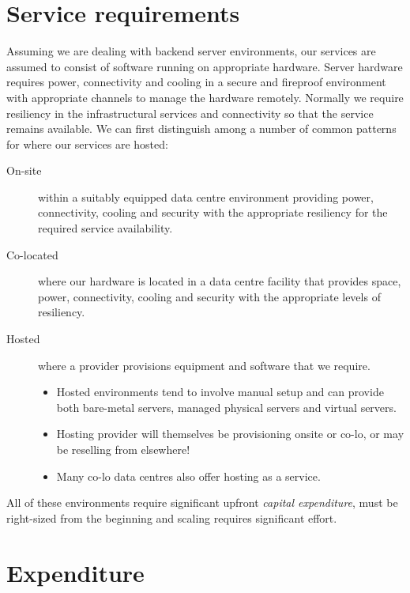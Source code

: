 \section{Service requirements}
\label{sec:service-models}

Assuming we are dealing with backend server environments, our services
are assumed to consist of software running on appropriate hardware.
Server hardware requires power, connectivity and cooling in a secure and
fireproof environment with appropriate channels to manage the hardware
remotely. Normally we require resiliency in the infrastructural services
and connectivity so that the service remains available. We can first
distinguish among a number of common patterns for where our services are
hosted:

\begin{description}
\item[On-site]
  within a suitably equipped data centre environment providing power,
  connectivity, cooling and security with the appropriate resiliency for
  the required service availability.
\item[Co-located]
  where our hardware is located in a data centre facility that provides
  space, power, connectivity, cooling and security with the appropriate
  levels of resiliency.
\item[Hosted]
  where a provider provisions equipment and software that we require.
  
  \begin{itemize}
  \item
    Hosted environments tend to involve manual setup and can provide both
    bare-metal servers, managed physical servers and virtual servers.
  \item
    Hosting provider will themselves be provisioning onsite or co-lo, or
    may be reselling from elsewhere!
  \item
    Many co-lo data centres also offer hosting as a service.
  \end{itemize}
\end{description}

All of these environments require significant upfront \emph{capital
expenditure}, must be right-sized from the beginning and scaling
requires significant effort.

\section{Expenditure}
\label{sec:expenditure}

